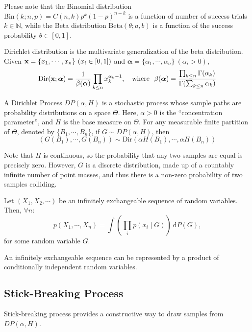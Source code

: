 Please note that the Binomial distribution $\mathrm{Bin}(k; n, p) = C(n, k) p^k (1-p)^{n-k}$ is a function of number of success trials $k \in \mathbb{N}$, while the Beta distribution $\mathrm{Beta}(\theta; a, b)$ is a function of the success probability $\theta \in [0, 1]$.

\begin{definition}
	Dirichlet distribution is the multivariate generalization of the beta distribution. Given $\mathbf{x} = \{ x_1, \cdots, x_n \}\ (x_i \in [0, 1])$ and $\boldsymbol{\alpha} = \{ \alpha_1, \cdots, \alpha_n \}\ (\alpha_i > 0)$,
	$$
	\mathrm{Dir}(\mathbf{x}; \boldsymbol{\alpha}) = \frac{1}{\beta(\boldsymbol{\alpha})} \prod_{k \leq n} x_k^{\alpha_k - 1}, \quad \text{where}\ \  \beta(\boldsymbol{\alpha}) = \frac{\prod_{k\leq n} \Gamma(\alpha_k)}{\Gamma(\sum_{k\leq n} \alpha_k)}
	$$
\end{definition}

\begin{definition}
	A Dirichlet Process $DP(\alpha, H)$ is a stochastic process whose sample paths are probability distributions on a space $\Theta$. Here, $\alpha > 0$ is the ``concentration parameter'', and $H$ is the base measure on $\Theta$. For any measurable finite partition of $\Theta$, denoted by $\{B_1, \cdots, B_n\}$, if $G\sim DP(\alpha, H)$, then 
	$$
	(G(B_1), \cdots, G(B_n)) \sim \mathrm{Dir}(\alpha H(B_1), \cdots, \alpha H(B_n))
	$$
\end{definition}
\remark Note that $H$ is continuous, so the probability that any two samples are equal is precisely zero. However, $G$ is a discrete distribution, made up of a countably infinite number of point masses, and thus there is a non-zero probability of two samples colliding.

\begin{theorem}
Let $(X_1, X_2, \cdots)$ be an infinitely exchangeable sequence of random variables. Then, $\forall n$:
$$
p(X_1, \cdots, X_n) = \int (\prod_i p(x_i \mid G))\ \mathrm{d} P(G),
$$
for some random variable $G$.	
\end{theorem}
\remark An infinitely exchangeable sequence can be represented by a product of conditionally independent random variables.

\subsection{Stick-Breaking Process}
Stick-breaking process provides a constructive way to draw samples from $DP(\alpha, H)$.

